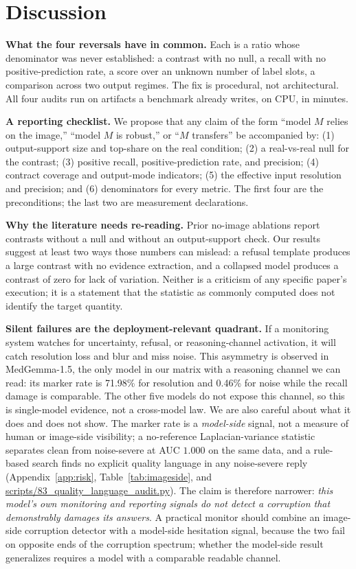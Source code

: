 \section{Discussion}
\label{sec:discussion}

\textbf{What the four reversals have in common.} Each is a ratio whose denominator was never established: a contrast with no null, a recall with no positive-prediction rate, a score over an unknown number of label slots, a comparison across two output regimes. The fix is procedural, not architectural. All four audits run on artifacts a benchmark already writes, on CPU, in minutes.

\textbf{A reporting checklist.} We propose that any claim of the form ``model $M$ relies on the image,'' ``model $M$ is robust,'' or ``$M$ transfers'' be accompanied by: (1) output-support size and top-share on the real condition; (2) a real-vs-real null for the contrast; (3) positive recall, positive-prediction rate, and precision; (4) contract coverage and output-mode indicators; (5) the effective input resolution and precision; and (6) denominators for every metric. The first four are the preconditions; the last two are measurement declarations.

\textbf{Why the literature needs re-reading.} Prior no-image ablations report contrasts without a null and without an output-support check. Our results suggest at least two ways those numbers can mislead: a refusal template produces a large contrast with no evidence extraction, and a collapsed model produces a contrast of zero for lack of variation. Neither is a criticism of any specific paper's execution; it is a statement that the statistic as commonly computed does not identify the target quantity.

\textbf{Silent failures are the deployment-relevant quadrant.} If a monitoring system watches for uncertainty, refusal, or reasoning-channel activation, it will catch resolution loss and blur and miss noise. This asymmetry is observed in MedGemma-1.5, the only model in our matrix with a reasoning channel we can read: its marker rate is 71.98\% for resolution and 0.46\% for noise while the recall damage is comparable. The other five models do not expose this channel, so this is single-model evidence, not a cross-model law. We are also careful about what it does and does not show. The marker rate is a \emph{model-side} signal, not a measure of human or image-side visibility; a no-reference Laplacian-variance statistic separates clean from noise-severe at AUC $1.000$ on the same data, and a rule-based search finds no explicit quality language in any noise-severe reply (Appendix~\ref{app:risk}, Table~\ref{tab:imageside}, and \url{scripts/83_quality_language_audit.py}). The claim is therefore narrower: \emph{this model's own monitoring and reporting signals do not detect a corruption that demonstrably damages its answers}. A practical monitor should combine an image-side corruption detector with a model-side hesitation signal, because the two fail on opposite ends of the corruption spectrum; whether the model-side result generalizes requires a model with a comparable readable channel.

